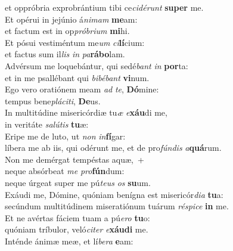 \evenverse et oppróbria exprobrántium tibi ce\textit{ci}\textit{dé}\textit{runt} \textbf{su}\textbf{per} me.\\
\oddverse Et opérui in jejúnio á\textit{ni}\textit{mam} \textbf{me}am:~\*\\
\oddverse et factum est in op\textit{pró}\textit{bri}\textit{um} \textbf{mi}hi.\\
\evenverse Et pósui vestiméntum me\textit{um} \textit{ci}\textbf{lí}cium:~\*\\
\evenverse et factus sum il\textit{lis} \textit{in} \textit{pa}\textbf{rá}\textbf{bo}lam.\\
\oddverse Advérsum me loquebántur, qui sedé\textit{bant} \textit{in} \textbf{por}ta:~\*\\
\oddverse et in me psallébant qui \textit{bi}\textit{bé}\textit{bant} \textbf{vi}num.\\
\evenverse Ego vero oratiónem meam \textit{ad} \textit{te}, \textbf{Dó}mine:~\*\\
\evenverse tempus bene\textit{plá}\textit{ci}\textit{ti}, \textbf{De}us.\\
\oddverse In multitúdine misericórdiæ tu\textit{æ} \textit{e}\textbf{xáu}di me,~\*\\
\oddverse in veritáte \textit{sa}\textit{lú}\textit{tis} \textbf{tu}æ:\\
\evenverse Eripe me de luto, ut \textit{non} \textit{in}\textbf{fí}gar:~\*\\
\evenverse líbera me ab iis, qui odérunt me, et de pro\textit{fún}\textit{dis} \textit{a}\textbf{quá}rum.\\
\oddverse Non me demérgat tempéstas aquæ,~+\\
\oddverse  neque absórbeat \textit{me} \textit{pro}\textbf{fún}dum:~\*\\
\oddverse neque úrgeat super me pú\textit{te}\textit{us} \textit{os} \textbf{su}um.\\
\evenverse Exáudi me, Dómine, quóniam benígna est misericór\textit{di}\textit{a} \textbf{tu}a:~\*\\
\evenverse secúndum multitúdinem miseratiónum tuárum \textit{ré}\textit{spi}\textit{ce} \textbf{in} me.\\
\oddverse Et ne avértas fáciem tuam a pú\textit{e}\textit{ro} \textbf{tu}o:~\*\\
\oddverse quóniam tríbulor, veló\textit{ci}\textit{ter} \textit{e}\textbf{xáu}\textbf{di} me.\\
\evenverse Inténde ánimæ meæ, et lí\textit{be}\textit{ra} \textbf{e}am:~\*\\
